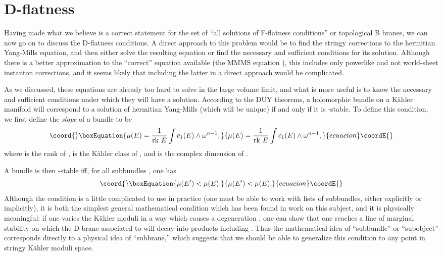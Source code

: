\documentclass[a4paper,12pt]{amsart}
\numberwithin{equation}{section}
\theoremstyle{plain}
\theoremstyle{definition}
\def \ap {\alpha'}
\def\rk{{\rm rk\ }}
\begin{document}
\section{D-flatness}

Having made what we believe is a correct statement for the set of
``all solutions of F-flatness conditions'' or topological B branes, we
can now go on to discuss the D-flatness conditions.  A direct approach
to this problem would be to find the stringy corrections to the
hermitian Yang-Mills equation, and then either solve the resulting
equation or find the necessary and sufficient conditions for its
solution.  Although there is a better approximation to the ``correct''
equation available (the MMMS equation \cite{MMMS}), this includes only
powerlike \myHighlight{$\ap$}\coordHE{} and not world-sheet instanton corrections, and it
seems likely that including the latter in a direct approach would be
complicated.  

As we discussed, these equations are already too hard to solve in
the large volume limit, and what is more useful is to know the
necessary
and sufficient conditions under which they will have a solution.
According to the DUY theorems,
a holomorphic bundle on a K\"ahler manifold \coordHE{}
will correspond to a solution of hermitian Yang-Mills (which will
be unique) if and only if it is \myHighlight{$\mu$}\coordHE{}-stable.  To define this
condition,
we first define the {\it slope} \coordHE{} of a bundle \coordHE{} to be
\begin{equation}\coord{}\boxEquation{
\mu(E) = \frac{1}{\rk E}\int c_1(E)\wedge \omega^{n-1} ,
}{
\mu(E) = \frac{1}{\rk E}\int c_1(E)\wedge \omega^{n-1} ,
}{ecuacion}\coordE{}\end{equation}
where \myHighlight{$\rk E$}\coordHE{} is the rank of \coordHE{}, \myHighlight{$\omega$}\coordHE{} is the K\"ahler class of
\coordHE{}, and \coordHE{} is the complex dimension of \coordHE{}.

A bundle \coordHE{} is then \myHighlight{$\mu$}\coordHE{}-stable iff, for all subbundles \coordHE{}, one
has
\begin{equation}\coord{}\boxEquation{
\mu(E') < \mu(E).
}{
\mu(E') < \mu(E).
}{ecuacion}\coordE{}\end{equation}
Although the condition is a little complicated to use in practice (one
must be able to work with lists of subbundles, either explicitly or
implicitly), it is both the simplest general mathematical condition
which has been found in work on this subject, and it is physically
meaningful: if one varies the K\"ahler moduli in a way which
causes a degeneration \coordHE{}, one can show that one reaches
a line of marginal stability on which the D-brane associated to \coordHE{}
will decay into products including \coordHE{}.  Thus the mathematical idea
of ``subbundle'' or ``subobject'' corresponds directly to a physical
idea of ``subbrane,'' which suggests that we should be able to
generalize this condition to any point in stringy K\"ahler moduli
space.
\end{document}
